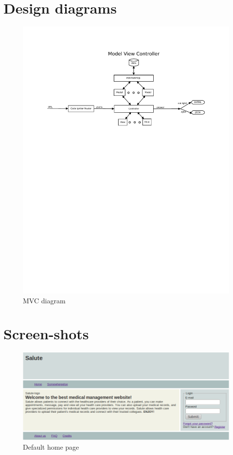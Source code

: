 \chapter{Design diagrams}
\label{app:diagrams}




\begin{figure}
\centering
\includegraphics[scale=0.7]{mvc.pdf}
\caption{MVC diagram}
\end{figure}

\chapter{Screen-shots}
\begin{figure}
\includegraphics[scale=0.4]{screenshots/Default.png}
\caption{Default home page}
\end{figure}

